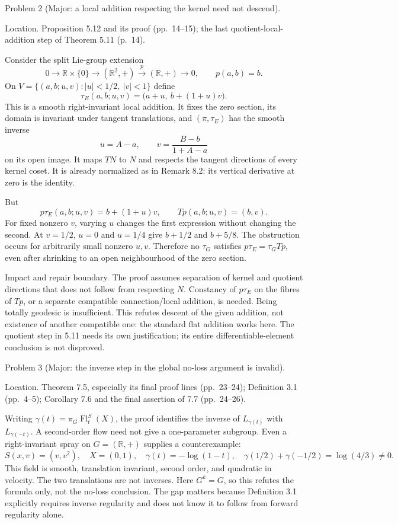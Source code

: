 \documentclass[10pt]{article}
\begin{document}
Problem 2 (Major: a local addition respecting the kernel need not descend).\par
Location. Proposition 5.12 and its proof (pp. 14–15); the last quotient-local-addition step of Theorem 5.11 (p. 14).\par
Consider the split Lie-group extension \[0\longrightarrow\mathbb R\times\{0\}\longrightarrow(\mathbb R^2,+)
 \xrightarrow{p}(\mathbb R,+)\longrightarrow0,\qquad p(a,b)=b.\] On \(V=\{(a,b;u,v):|u|<1/2,\ |v|<1\}\) define \[\tau_E(a,b;u,v)=\bigl(a+u,\ b+(1+u)v\bigr).\] This is a smooth right-invariant local addition. It fixes the zero section, its domain is invariant under tangent translations, and \((\pi,\tau_E)\) has the smooth inverse \[u=A-a,\qquad v=\frac{B-b}{1+A-a}\] on its open image. It maps \(TN\) to \(N\) and respects the tangent directions of every kernel coset. It is already normalized as in Remark 8.2: its vertical derivative at zero is the identity.\par
But \[p\tau_E(a,b;u,v)=b+(1+u)v,\qquad Tp(a,b;u,v)=(b,v).\] For fixed nonzero \(v\), varying \(u\) changes the first expression without changing the second. At \(v=1/2\), \(u=0\) and \(u=1/4\) give \(b+1/2\) and \(b+5/8\). The obstruction occurs for arbitrarily small nonzero \(u,v\). Therefore no \(\tau_G\) satisfies \(p\tau_E=\tau_G Tp\), even after shrinking to an open neighbourhood of the zero section.\par
Impact and repair boundary. The proof assumes separation of kernel and quotient directions that does not follow from respecting \(N\). Constancy of \(p\tau_E\) on the fibres of \(Tp\), or a separate compatible connection/local addition, is needed. Being totally geodesic is insufficient. This refutes descent of the given addition, not existence of another compatible one: the standard flat addition works here. The quotient step in 5.11 needs its own justification; its entire differentiable-element conclusion is not disproved.\par
Problem 3 (Major: the inverse step in the global no-loss argument is invalid).\par
Location. Theorem 7.5, especially its final proof lines (pp. 23–24); Definition 3.1 (pp. 4–5); Corollary 7.6 and the final assertion of 7.7 (pp. 24–26).\par
Writing \(\gamma(t)=\pi_G\operatorname{Fl}_t^S(X)\), the proof identifies the inverse of \(L_{\gamma(t)}\) with \(L_{\gamma(-t)}\). A second-order flow need not give a one-parameter subgroup. Even a right-invariant spray on \(G=(\mathbb R,+)\) supplies a counterexample: \[S(x,v)=(v,v^2),\quad X=(0,1),\quad
 \gamma(t)=-\log(1-t),\quad
 \gamma(1/2)+\gamma(-1/2)=\log(4/3)\ne0.\] This field is smooth, translation invariant, second order, and quadratic in velocity. The two translations are not inverses. Here \(G^k=G\), so this refutes the formula only, not the no-loss conclusion. The gap matters because Definition 3.1 explicitly requires inverse regularity and does not know it to follow from forward regularity alone.\par
\end{document}
